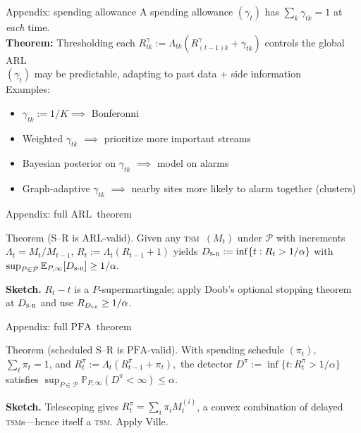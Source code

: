 \documentclass[10pt,aspectratio=169]{beamer}
\newcommand{\E}{\mathbb{E}}
\newcommand{\Prob}{\mathbb{P}}
\newcommand{\Mt}{M_{t}}
\newcommand{\Rt}{R_{t}}
\newcommand{\Lt}{\Lambda_{t}}
\newcommand{\TSM}{\textsc{tsm}}
\newcommand{\SR}{\textsc{s-r}}
\newcommand{\ARL}{\ensuremath{\mathrm{ARL}}}
\newcommand{\PFA}{\ensuremath{\mathrm{PFA}}}
\newcommand{\Pc}{\mathcal{P}}
\begin{document}
\begin{frame}{Appendix: spending allowance}
    A \alert{spending allowance} $(\gamma_t)$ has $\sum_k \gamma_{tk} = 1$ at \emph{each} time.\\
    \medskip
    \textbf{Theorem:} Thresholding each $R_{tk}^\gamma := \Lambda_{tk} (R_{(t-1)k}^\gamma + \gamma_{tk})$ controls the global ARL \\
    \medskip
    $(\gamma_t)$ may be predictable, adapting to past data + side information\\
    \medskip
    Examples:
    \begin{itemize}
        \item $\gamma_{tk} := 1/K \implies$ Bonferonni
        \item Weighted $\gamma_{tk}$ $\implies$ prioritize more important streams 
        \item Bayesian posterior on $\gamma_{tk}$ $\implies$ model on alarms
        \item Graph-adaptive $\gamma_{tk}$ $\implies$ nearby sites more likely to alarm together (clusters)
    \end{itemize}
\end{frame}


\begin{frame}{Appendix: full \ARL\ theorem}
  \begin{block}{Theorem (S--R is \ARL-valid).}
    Given any \TSM\ $(\Mt)$ under $\Pc$ with increments $\Lt = \Mt/M_{t-1}$,
    \(\Rt := \Lt(R_{t-1} + 1)\) yields
    \(D_{\SR} := \inf\{t : \Rt > 1/\alpha\}\) with
    \(\sup_{P\in\Pc} \E_{P,\infty}[D_{\SR}] \ge 1/\alpha.\)
  \end{block}
  \medskip
  \textbf{Sketch.} $\Rt - t$ is a $P$-supermartingale; apply Doob's optional stopping
  theorem at $D_{\SR}$ and use $R_{D_{\SR}} \ge 1/\alpha$.
\end{frame}

\begin{frame}{Appendix: full \PFA\ theorem}
  \begin{block}{Theorem (scheduled S--R is \PFA-valid).}
    With spending schedule $(\pi_t)$, $\sum_t \pi_t = 1$, and
    \(\Rt^\pi := \Lt(R_{t-1}^\pi + \pi_t),\) the detector
    \(D^\pi := \inf\{t : \Rt^\pi > 1/\alpha\}\) satisfies
    \(\sup_{P\in\Pc}\Prob_{P,\infty}(D^\pi < \infty) \le \alpha.\)
  \end{block}
  \medskip
  \textbf{Sketch.} Telescoping gives $\Rt^\pi = \sum_i \pi_i M_t^{(i)}$,
  a convex combination of delayed \TSM s---hence itself a \TSM. Apply Ville.
\end{frame}
\end{document}
